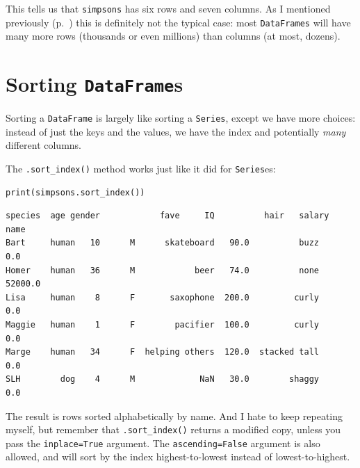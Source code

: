 This tells us that \texttt{simpsons} has six rows and seven columns. As I
mentioned previously (p.~\pageref{tallAndSkinny}) this is definitely not the
typical case: most \texttt{DataFrames} will have many more rows (thousands or
even millions) than columns (at most, dozens).

\section{Sorting \texttt{DataFrame}s}

Sorting a \texttt{DataFrame} is largely like sorting a \texttt{Series}, except
we have more choices: instead of just the keys and the values, we have the
index and potentially \textit{many} different columns.

The \texttt{.sort\_index()} method works just like it did for
\texttt{Series}es:

\begin{samepage}
\begin{Verbatim}[fontsize=\small,samepage=true,frame=single,framesep=3mm]
print(simpsons.sort_index())
\end{Verbatim}
\vspace{-.2in}

\begin{Verbatim}[fontsize=\CBCodeSmall,samepage=true,frame=leftline,framesep=5mm,framerule=1mm]
       species  age gender            fave     IQ          hair   salary
name                                                                    
Bart     human   10      M      skateboard   90.0          buzz      0.0
Homer    human   36      M            beer   74.0          none  52000.0
Lisa     human    8      F       saxophone  200.0         curly      0.0
Maggie   human    1      F        pacifier  100.0         curly      0.0
Marge    human   34      F  helping others  120.0  stacked tall      0.0
SLH        dog    4      M             NaN   30.0        shaggy      0.0
\end{Verbatim}
\end{samepage}

The result is rows sorted alphabetically by name. And I hate to keep repeating
myself, but remember that \texttt{.sort\_index()} returns a modified copy,
unless you pass the \texttt{inplace=True} argument. The
\texttt{ascending=False} argument is also allowed, and will sort by the index
highest-to-lowest instead of lowest-to-highest.

